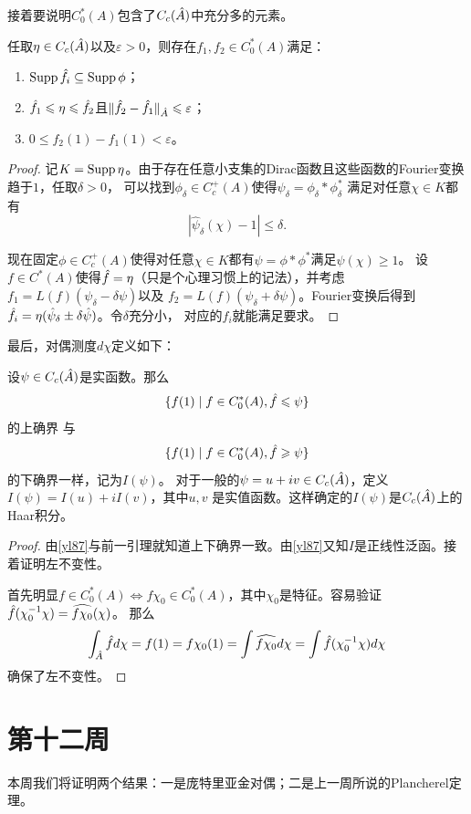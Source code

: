 接着要说明$C_0^*(A)$包含了$C_c(\hat{A})$中充分多的元素。
\begin{proposition}\label{appro}
    任取$\eta \in C_c(\hat{A})$以及$\varepsilon > 0$，则存在$f_1,f_2 \in C_0^*(A)$满足：
    \begin{enumerate}
        \item $\operatorname{Supp} \hat{f}_i \subseteq \operatorname{Supp} \phi$；
        \item $\hat{f}_1 \leqslant \eta \leqslant \hat{f}_2$且$\|\hat{f}_2-\hat{f}_1\|_{\hat{A}} \leqslant \varepsilon$；
        \item $0 \leqslant f_2(1) - f_1(1) < \varepsilon$。
    \end{enumerate}
\end{proposition}
\begin{proof}
    记$K = \operatorname{Supp} \eta$。由于存在任意小支集的Dirac函数且这些函数的Fourier变换趋于$1$，任取$\delta > 0$，
    可以找到$\phi_\delta \in C_c^+(A)$使得$\psi_\delta = \phi_\delta * \phi_\delta^*$
    满足对任意$\chi \in K$都有\[|\hat{\psi}_\delta(\chi)-1| \leqslant \delta.\]

    现在固定$\phi \in  C_c^+(A)$使得对任意$\chi \in K$都有$\psi = \phi * \phi^*$满足$\hat{\psi}(\chi) \geqslant 1$。
    设$f \in C^*(A)$使得$\hat{f} = \eta$（只是个心理习惯上的记法），并考虑$f_1 = L(f)(\psi_\delta - \delta\psi)$以及
    $f_2 = L(f)(\psi_\delta + \delta\psi)$。Fourier变换后得到$\hat{f}_i = \eta(\hat{\psi}_\delta \pm \delta\hat{\psi})$。令$\delta$充分小，
    对应的$f_i$就能满足要求。
\end{proof}
最后，对偶测度$d\chi$定义如下：
\begin{proposition}
    设$\psi \in C_c(\hat{A})$是实函数。那么\[\{f(1)\mid f\in C_0^*(A),\hat{f} \leqslant\psi\}\]的上确界
    与\[\{f(1)\mid f\in C_0^*(A),\hat{f} \geqslant\psi\}\]的下确界一样，记为$I(\psi)$。
    对于一般的$\psi = u+iv \in C_c(\hat{A})$，定义$I(\psi) = I(u)+iI(v)$，其中$u,v$
    是实值函数。这样确定的$I(\psi)$是$C_c(\hat{A})$上的Haar积分。
\end{proposition}
\begin{proof}
    由\ref{yl87}与前一引理就知道上下确界一致。由\ref{yl87}又知$I$是正线性泛函。接着证明左不变性。

    首先明显$f \in C_0^*(A) \iff f\chi_0 \in C_0^*(A)$，其中$\chi_0$是特征。容易验证$\hat{f}(\chi_0^{-1}\chi) = \widehat{f\chi_0}(\chi)$。
    那么\[\int_{\hat{A}} \hat{f} d\chi = f(1) = f\chi_0(1) = \int \widehat{f\chi_0}d\chi 
    = \int \hat{f}(\chi_0^{-1}\chi)d\chi\]确保了左不变性。
\end{proof}
\section{第十二周}
本周我们将证明两个结果：一是庞特里亚金对偶；二是上一周所说的Plancherel定理。

